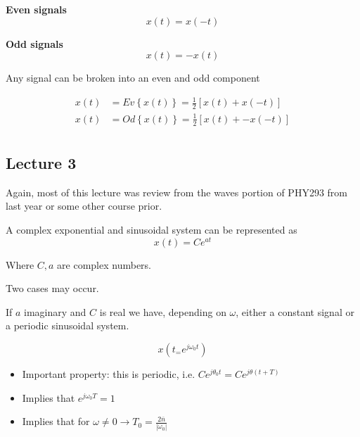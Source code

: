\documentclass[../notes.tex]{subfiles}
\begin{document}
\begin{definition}
	\textbf{Even signals} 
	\begin{equation}
		x(t) = x(-t)
		\label{eq:355:even_signal}
	\end{equation}
\end{definition}

\begin{definition}
	\textbf{Odd signals} 
	\begin{equation}
		x(t) = -x(t)
		\label{eq:355:odd_signal}
	\end{equation}
\end{definition}


\begin{theorem}
	Any signal can be broken into an even and odd component

	\begin{equation}
		\begin{split}
			x(t) &= Ev \left\{ x(t) \right\} = \frac{1}{2} \left[ x(t) + x(-t) \right]  \\
			x(t) &= Od \left\{ x(t) \right\} = \frac{1}{2} \left[ x(t) + -x(-t) \right]  \\
		\end{split}
		\label{eq:355:even_odd_decomposition}
	\end{equation}
\end{theorem}


\subsection{Lecture 3}

Again, most of this lecture was review from the waves portion of PHY293 from last year or some other course prior.



A complex exponential and sinusoidal system can be represented as 
\begin{equation}
	x(t) = C e^{at}
\end{equation}

Where $ C, a $ are complex numbers.

Two cases may occur.

If $ a $ imaginary and $ C $ is real we have, depending on $ \omega $, either a constant signal or a periodic sinusoidal system.

\begin{equation}
	x(t_ = e^{j\omega_0t}) 
\end{equation}

\begin{itemize}
	\item Important property: this is periodic, i.e. $ Ce^{j\theta_0 t} = Ce^{j \theta (t + T)} $ 
	\item Implies that $ e^{j\omega_0T} = 1 $ 
	\item Implies that for $ \omega \neq  0 \rightarrow T_0 = \frac{2 \overline{n}}{|\omega_0|} $ 	
\end{itemize}
\end{document}
